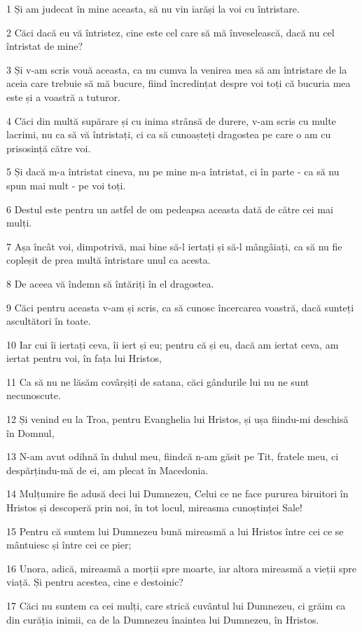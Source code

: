\par 1 Și am judecat în mine aceasta, să nu vin iarăși la voi cu întristare.
\par 2 Căci dacă eu vă întristez, cine este cel care să mă înveselească, dacă nu cel întristat de mine?
\par 3 Și v-am scris vouă aceasta, ca nu cumva la venirea mea să am întristare de la aceia care trebuie să mă bucure, fiind încredințat despre voi toți că bucuria mea este și a voastră a tuturor.
\par 4 Căci din multă supărare și cu inima strânsă de durere, v-am scris cu multe lacrimi, nu ca să vă întristați, ci ca să cunoașteți dragostea pe care o am cu prisosință către voi.
\par 5 Și dacă m-a întristat cineva, nu pe mine m-a întristat, ci în parte - ca să nu spun mai mult - pe voi toți.
\par 6 Destul este pentru un astfel de om pedeapsa aceasta dată de către cei mai mulți.
\par 7 Așa încât voi, dimpotrivă, mai bine să-l iertați și să-l mângâiați, ca să nu fie copleșit de prea multă întristare unul ca acesta.
\par 8 De aceea vă îndemn să întăriți în el dragostea.
\par 9 Căci pentru aceasta v-am și scris, ca să cunosc încercarea voastră, dacă sunteți ascultători în toate.
\par 10 Iar cui îi iertați ceva, îi iert și eu; pentru că și eu, dacă am iertat ceva, am iertat pentru voi, în fața lui Hristos,
\par 11 Ca să nu ne lăsăm covârșiți de satana, căci gândurile lui nu ne sunt necunoscute.
\par 12 Și venind eu la Troa, pentru Evanghelia lui Hristos, și ușa fiindu-mi deschisă în Domnul,
\par 13 N-am avut odihnă în duhul meu, fiindcă n-am găsit pe Tit, fratele meu, ci despărțindu-mă de ei, am plecat în Macedonia.
\par 14 Mulțumire fie adusă deci lui Dumnezeu, Celui ce ne face pururea biruitori în Hristos și descoperă prin noi, în tot locul, mireasma cunoștinței Sale!
\par 15 Pentru că suntem lui Dumnezeu bună mireasmă a lui Hristos între cei ce se mântuiesc și între cei ce pier;
\par 16 Unora, adică, mireasmă a morții spre moarte, iar altora mireasmă a vieții spre viață. Și pentru acestea, cine e destoinic?
\par 17 Căci nu suntem ca cei mulți, care strică cuvântul lui Dumnezeu, ci grăim ca din curăția inimii, ca de la Dumnezeu înaintea lui Dumnezeu, în Hristos.


